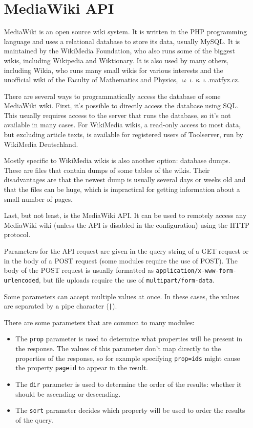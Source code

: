 \chapter{MediaWiki API}

MediaWiki is an open source wiki system.
It is written in the PHP programming language and uses a relational database to store its data, usually MySQL.
It is maintained by the WikiMedia Foundation, who also runs some of the biggest wikis, including Wikipedia and Wiktionary.
It is also used by many others, including Wikia, who runs many small wikis for various interests and
the unofficial wiki of the Faculty of Mathematics and Physics, $\upomega\upiota\upkappa\upiota$.matfyz.cz.

There are several ways to programmatically access the database of some MediaWiki wiki.
First, it's possible to directly access the database using SQL.
This usually requires access to the server that runs the database, so it's not available in many cases.
For WikiMedia wikis, a read-only access to most data, but excluding article texts,
is available for registered users of Toolserver, run by WikiMedia Deutschland.

Mostly specific to WikiMedia wikis is also another option: database dumps. These are files that contain
dumps of some tables of the wikis. Their disadvantages are that the newest dump is usually several days or weeks old
and that the files can be huge, which is impractical for getting information about a small number of pages.

Last, but not least, is the MediaWiki API.
It can be used to remotely access any MediaWiki wiki (unless the API is disabled in the configuration)
using the HTTP protocol.

Parameters for the API request are given in the query string of a GET request or in the body of a POST request
(some modules require the use of POST).
The body of the POST request is usually formatted as \texttt{application/x-www-form-urlencoded},
but file uploads require the use of \texttt{multipart/form-data}.

Some parameters can accept multiple values at once.
In these cases, the values are separated by a pipe character (\texttt{|}).

There are some parameters that are common to many modules:

\begin{itemize}
\item The \texttt{prop} parameter is used to determine what properties will be present in the response.
The values of this parameter don't map directly to the properties of the response,
so for example specifying \texttt{prop=ids} might cause the property \texttt{pageid} to appear in the result.
\item The \texttt{dir} parameter is used to determine the order of the results:
whether it should be ascending or descending.
\item The \texttt{sort} parameter decides which property will be used to order the results of the query.
\end{itemize}

